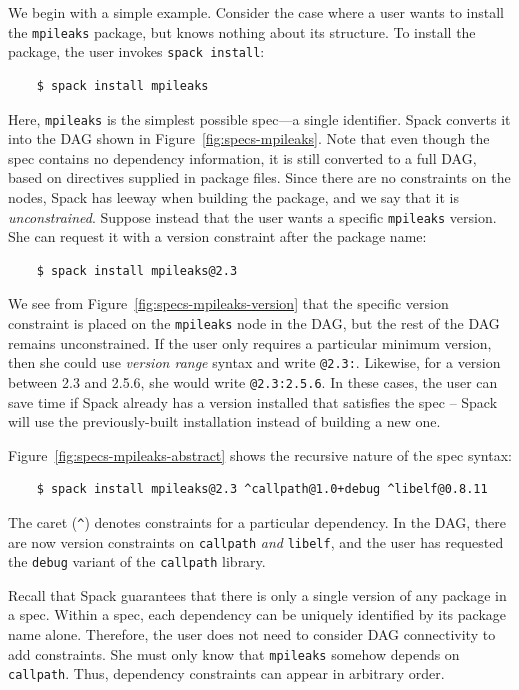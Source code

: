 We begin with a simple example.
Consider the case where a user wants to install the {\tt mpileaks} package, but knows
nothing about its structure.  To install the package, the user invokes {\tt spack install}:
%
\begin{verbatim}
    $ spack install mpileaks
\end{verbatim}
%
Here, {\tt mpileaks} is the simplest possible spec---a single identifier.
Spack converts it into the DAG shown in Figure~\ref{fig:specs-mpileaks}.
Note that even though the spec contains no dependency information, it is still
converted to a full DAG, based on directives supplied in package files. Since there
are no constraints on the nodes, Spack has leeway when building the
package, and we say that it is {\it unconstrained}.
%
Suppose instead that the user wants a specific {\tt mpileaks} version.
She can request it with a version constraint after the package name:
%
\begin{verbatim}
    $ spack install mpileaks@2.3
\end{verbatim}
%
We see from Figure~\ref{fig:specs-mpileaks-version} that the specific version constraint is
placed on the {\tt mpileaks} node in the DAG, but the rest of the DAG remains unconstrained.
If the user only requires a particular minimum version, then she could use
{\it version range} syntax
and write {\tt @2.3:}.  Likewise, for a version between 2.3 and 2.5.6, she would write
{\tt @2.3:2.5.6}. In these cases, the user can save time if
Spack already has a version installed that satisfies the spec -- Spack will use
the previously-built installation instead of building a new one.

Figure~\ref{fig:specs-mpileaks-abstract} shows the recursive nature of the spec syntax:
%
\begin{verbatim}
    $ spack install mpileaks@2.3 ^callpath@1.0+debug ^libelf@0.8.11
\end{verbatim}
%
The caret (\verb|^|) denotes constraints for a particular dependency.  In the DAG,
there are now version constraints on {\tt callpath} {\it and} {\tt libelf},
and the user has requested the {\tt debug} variant of the {\tt callpath} library.

Recall that Spack guarantees that there is only a single version of any package in
a spec.  Within a spec, each dependency can be uniquely
identified by its package name alone.  Therefore, the user does not need to consider
DAG connectivity to add constraints.  She must only know that {\tt mpileaks}
somehow depends on {\tt callpath}.
Thus, dependency constraints can appear in arbitrary order.

